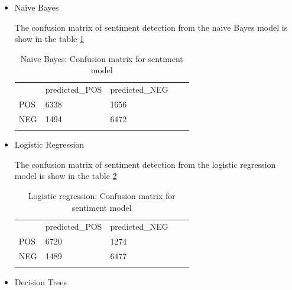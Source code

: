 \begin{itemize}
    \item  Naive Bayes
    
    The confusion matrix of sentiment detection from the naive Bayes model is show in the table \ref{tab:confusionmatrix_sentimenttweets_NB}
    
    \begin{table}[]
\centering
\begin{tabular}{lllll}
\cline{1-3}
\multicolumn{1}{|l|}{}   & \multicolumn{1}{l|}{predicted\_POS} & \multicolumn{1}{l|}{predicted\_NEG}  &  &  \\ \cline{1-3}
\multicolumn{1}{|l|}{POS} & \multicolumn{1}{l|}{6338}  & \multicolumn{1}{l|}{1656} &  &  \\ \cline{1-3}
\multicolumn{1}{|l|}{NEG}   & \multicolumn{1}{l|}{1494}  & \multicolumn{1}{l|}{6472}  &  &  \\ \cline{1-3}
                            &                           &                           &  & 
\end{tabular}
\caption{Naive Bayes: Confusion matrix for sentiment model}
\label{tab:confusionmatrix_sentimenttweets_NB}
\end{table}

\item  Logistic Regression
    
    The confusion matrix of sentiment detection from the logistic regression model is show in the table \ref{tab:confusionmatrix_sentimenttweets_LR}
    
    \begin{table}[]
\centering
\begin{tabular}{lllll}
\cline{1-3}
\multicolumn{1}{|l|}{}   & \multicolumn{1}{l|}{predicted\_POS} & \multicolumn{1}{l|}{predicted\_NEG}  &  &  \\ \cline{1-3}
\multicolumn{1}{|l|}{POS} & \multicolumn{1}{l|}{6720}  & \multicolumn{1}{l|}{1274} &  &  \\ \cline{1-3}
\multicolumn{1}{|l|}{NEG}   & \multicolumn{1}{l|}{1489}  & \multicolumn{1}{l|}{6477}  &  &  \\ \cline{1-3}
                            &                           &                           &  & 
\end{tabular}
\caption{Logistic regression: Confusion matrix for sentiment model}
\label{tab:confusionmatrix_sentimenttweets_LR}
\end{table}

\item  Decision Trees
    

\end{itemize}
